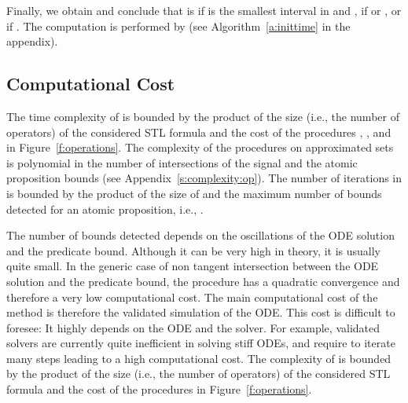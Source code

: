 \documentclass[paper]{ieice}
\begin{document}
Finally, we obtain  and conclude that  is  if  is the smallest interval in  and ,  if  or , or  if .
The computation is performed by  (see Algorithm~\ref{a:inittime} in the appendix).


\subsection{Computational Cost}
\label{s:complexity}

The time complexity of  is bounded by the product of the size (i.e., the number of operators) of the considered STL formula  and the cost of the procedures , , and  in Figure~\ref{f:operations}.
The complexity of the procedures on approximated sets is polynomial in the number of intersections of the signal and the atomic proposition bounds (see Appendix~\ref{s:complexity:op}). The number of iterations in  is bounded by the product of the size of  and the maximum number of bounds detected for an atomic proposition, i.e., .

The number of bounds detected depends on the oscillations of the ODE solution and the predicate bound. Although it can be very high in theory, it is usually quite small. In the generic case of non tangent intersection between the ODE solution and the predicate bound, the  procedure has a quadratic convergence and therefore a very low computational cost. The main computational cost of the method is therefore the validated simulation of the ODE. This cost is difficult to foresee: It highly depends on the ODE and the solver. For example, validated solvers are currently quite inefficient in solving stiff ODEs, and require to iterate many steps leading to a high computational cost. The complexity of  is bounded by the product of the size (i.e., the number of operators) of the considered STL formula  and the cost of the procedures in Figure~\ref{f:operations}.
\end{document}
